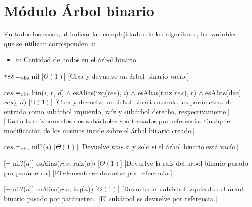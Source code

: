 \section{M\'odulo \'Arbol binario}

  En todos los casos, al indicar las complejidades de los algoritmos, las variables que se utilizan corresponden a:
  \vspace{-0.5em}\begin{itemize}
    \item $n$: Cantidad de nodos en el \'arbol binario.
  \end{itemize}

\begin{Interfaz}
  
  \begin{paramFormales}
    \paramGeneros{$\alpha$}
  \end{paramFormales}




    {$res =_{\mathrm{obs}}$ nil}
    [$\Theta(1)$]
    [Crea y devuelve un \'arbol binario vac\'io.]

    {$res$ $=_{\mathrm{obs}}$ bin($i$, $r$, $d$) $\land$ esAlias(izq($res$), $i$) $\land$ esAlias(raiz($res$), $r$) $\land$ esAlias(der($res$), $d$)}
    [$\Theta(1)$]
    [Crea y devuelve un \'arbol binario usando los par\'ametros de entrada como sub\'arbol izquierdo, ra\'iz y sub\'arbol derecho, respectivamente.]
    [Tanto la ra\'iz como los dos sub\'arboles son tomados por referencia. Cualquier modificaci\'on de los mismos incide sobre el \'arbol binario creado.]

    {$res$ $=_{\mathrm{obs}}$ nil?($a$)}
    [$\Theta(1)$]
    [Devuelve \emph{true} si y solo si el \'arbol binario est\'a vac\'io.]

    [$\neg$ nil?($a$)]
    {esAlias($res$, raiz($a$))}
    [$\Theta(1)$]
    [Devuelve la ra\'iz del \'arbol binario pasado por par\'ametro.]
    [El elemento se devuelve por referencia.]

    [$\neg$ nil?($a$)]
    {esAlias($res$, izq($a$))}
    [$\Theta(1)$]
    [Devuelve el sub\'arbol izquierdo del \'arbol binario pasado por par\'ametro.]
    [El sub\'arbol se devuelve por referencia.]


\end{Interfaz}
